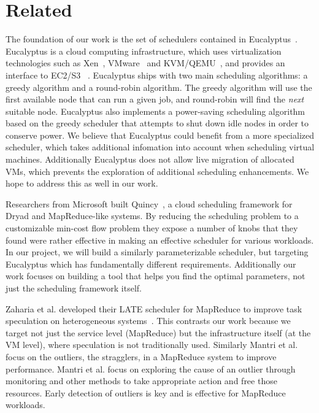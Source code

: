\section{Related}

The foundation of our work is the set of schedulers contained in
Eucalyptus~\cite{Eucalyptus}.  Eucalyptus is a cloud computing infrastructure,
which uses virtualization technologies such as Xen~\cite{Xen},
VMware~\cite{VMware} and KVM/QEMU~\cite{QEMU}, and provides an interface to
EC2/S3 ~\cite{EC2,S3}.   Eucalyptus ships with two main scheduling algorithms: a
greedy algorithm and a round-robin algorithm.  The greedy algorithm will use the
first available node that can run a given job, and round-robin will find the
\emph{next} suitable node.  Eucalyptus also implements a power-saving scheduling
algorithm based on the greedy scheduler that attempts to shut down idle nodes
in order to conserve power.  We believe that Eucalyptus could benefit from a
more specialized scheduler, which takes additional infomation into account when
scheduling virtual machines.  Additionally Eucalyptus does not allow live
migration of allocated VMs, which prevents the exploration of additional
scheduling enhancements.  We hope to address this as well in our work.

Researchers from Microsoft built Quincy~\cite{Quincy}, a cloud scheduling
framework for Dryad and MapReduce-like systems.  By reducing the scheduling
problem to a customizable min-cost flow problem they expose a number of knobs
that they found were rather effective in making an effective scheduler for
various workloads.  In our project, we will build a similarly parameterizable
scheduler, but targeting Eucalyptus which has fundamentally different
requirements.  Additionally our work focuses on building a tool that helps you
find the optimal parameters, not just the scheduling framework itself.

Zaharia et al. developed their LATE scheduler for MapReduce to improve task
speculation on heterogeneous systems~\cite{Zaharia}.  This contrasts our work
because we target not just the service level (MapReduce) but the infrastructure
itself (at the VM level), where speculation is not traditionally used.
Similarly Mantri et al.~\cite{Mantri} focus on the outliers, the stragglers, in
a MapReduce system to improve performance.  Mantri et al. focus on exploring the
cause of an outlier through monitoring and other methods to take appropriate
action and free those resources.  Early detection of outliers is key and is
effective for MapReduce workloads.

